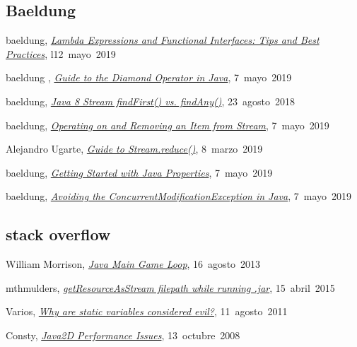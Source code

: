 \subsection*{Baeldung}

baeldung,
\href{https://www.baeldung.com/java-8-lambda-expressions-tips}{\textit{Lambda Expressions and Functional Interfaces: Tips and Best Practices}},
\mbox{l12 mayo 2019}

 baeldung ,
\href{https://www.baeldung.com/java-diamond-operator}{\textit{Guide to the Diamond Operator in Java}},
\mbox{7 mayo 2019}

baeldung,
\href{https://www.baeldung.com/java-stream-findfirst-vs-findany}{\textit{Java 8 Stream findFirst() vs. findAny()}},
\mbox{23 agosto 2018}

baeldung,
\href{https://www.baeldung.com/java-use-remove-item-stream}{\textit{Operating on and Removing an Item from Stream}},
\mbox{7 mayo 2019}

Alejandro Ugarte,
\href{https://www.baeldung.com/java-stream-reduce}{\textit{Guide to Stream.reduce()}},
\mbox{8 marzo 2019}

 baeldung,
\href{https://www.baeldung.com/java-properties}{\textit{Getting Started with Java Properties}},
\mbox{7 mayo 2019}

baeldung,
\href{https://www.baeldung.com/java-concurrentmodificationexception}{\textit{Avoiding the ConcurrentModificationException in Java}},
\mbox{7 mayo 2019}

\subsection*{stack overflow}

William Morrison,
\href{https://stackoverflow.com/a/18283279}{\textit{Java Main Game Loop}},
\mbox{16 agosto 2013}

mthmulders,
\href{https://stackoverflow.com/a/16010612}{\textit{getResourceAsStream filepath while running .jar}},
\mbox{15 abril 2015}

Varios,
\href{https://stackoverflow.com/questions/7026507/why-are-static-variables-considered-evil}{\textit{Why are static variables considered evil?}},
\mbox{11 agosto 2011}

Consty,
\href{https://stackoverflow.com/a/197060}{\textit{Java2D Performance Issues}},
\mbox{13 octubre 2008}


